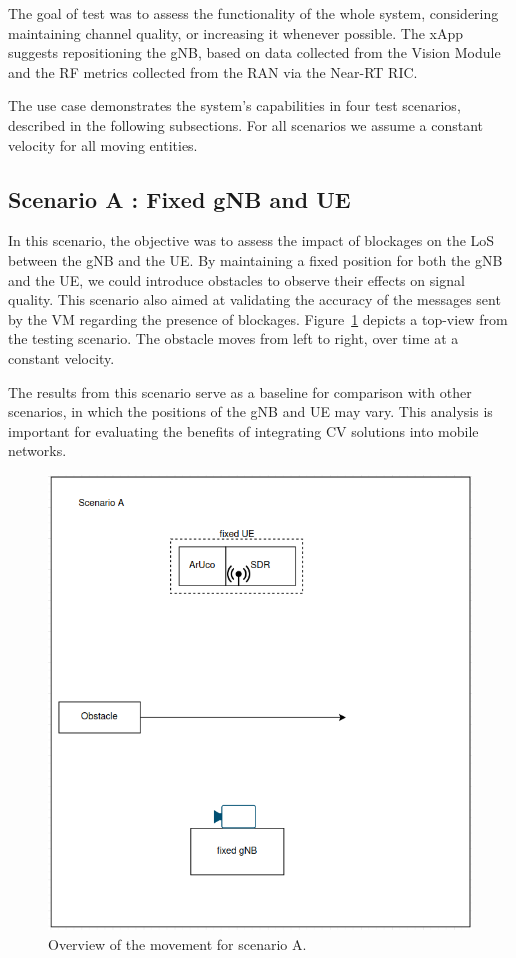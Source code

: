 The goal of test was to assess the functionality of the whole system, considering maintaining channel quality, or increasing it whenever possible.
The xApp suggests repositioning the gNB, based on data collected from the Vision Module and the RF metrics collected from the RAN via the Near-RT RIC\@.

The use case demonstrates the system's capabilities in four test scenarios, described in the following subsections.
For all scenarios we assume a constant velocity for all moving entities.

\subsection{Scenario A : Fixed gNB and UE}\label{subsec:scenario-0-:-fixed-gnb-and-ue}

In this scenario, the objective was to assess the impact of blockages on the LoS between the gNB and the UE\@.
By maintaining a fixed position for both the gNB and the UE, we could introduce obstacles to observe their effects on signal quality.
This scenario also aimed at validating the accuracy of the messages sent by the VM regarding the presence of blockages.
Figure~\ref{fig:test_fixed} depicts a top-view from the testing scenario.
The obstacle moves from left to right, over time at a constant velocity.

The results from this scenario serve as a baseline for comparison with other scenarios, in which the positions of the gNB and UE may vary.
This analysis is important for evaluating the benefits of integrating CV solutions into mobile networks.

\begin{figure}[H]
    \centering
    \includegraphics[width=0.5\linewidth]{figures/scenario0}
    \caption{Overview of the movement for scenario A.}
    \label{fig:test_fixed}
\end{figure}

